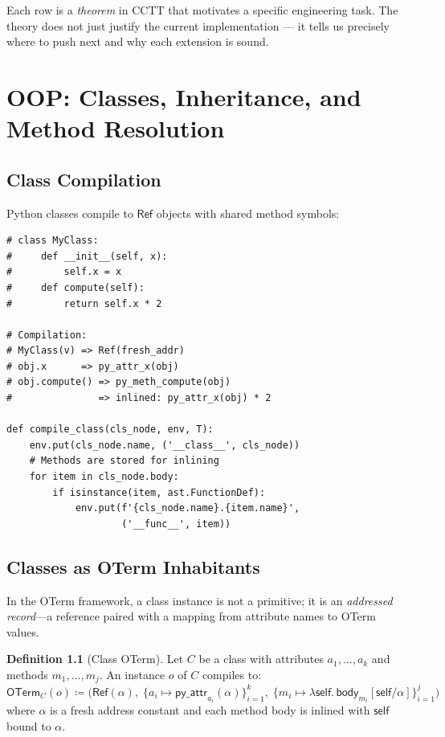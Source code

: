 \documentclass[11pt,a4paper]{report}
\theoremstyle{definition}
\newtheorem{definition}{Definition}[chapter]
\theoremstyle{plain}
\begin{document}
Each row is a \emph{theorem} in CCTT that motivates a specific
engineering task.  The theory does not just justify the current
implementation --- it tells us precisely where to push next and
why each extension is sound.


\chapter{OOP: Classes, Inheritance, and Method Resolution}
\label{ch:oop}

\section{Class Compilation}

Python classes compile to $\mathsf{Ref}$ objects with shared method
symbols:

\begin{lstlisting}[caption={Class compilation}]
# class MyClass:
#     def __init__(self, x):
#         self.x = x
#     def compute(self):
#         return self.x * 2

# Compilation:
# MyClass(v) => Ref(fresh_addr)
# obj.x      => py_attr_x(obj)
# obj.compute() => py_meth_compute(obj)
#               => inlined: py_attr_x(obj) * 2

def compile_class(cls_node, env, T):
    env.put(cls_node.name, ('__class__', cls_node))
    # Methods are stored for inlining
    for item in cls_node.body:
        if isinstance(item, ast.FunctionDef):
            env.put(f'{cls_node.name}.{item.name}',
                    ('__func__', item))
\end{lstlisting}

\section{Classes as OTerm Inhabitants}

In the OTerm framework, a class instance is not a primitive; it is
an \emph{addressed record}---a reference paired with a mapping from
attribute names to OTerm values.

\begin{definition}[Class OTerm]
Let $C$ be a class with attributes $a_1, \ldots, a_k$ and methods
$m_1, \ldots, m_j$.  An instance $o$ of $C$ compiles to:
\[
  \mathsf{OTerm}_C(o) \coloneqq \bigl(\mathsf{Ref}(\alpha),\;
    \{a_i \mapsto \mathsf{py\_attr}_{a_i}(\alpha)\}_{i=1}^k,\;
    \{m_i \mapsto \lambda \mathsf{self}.\, \mathsf{body}_{m_i}[\mathsf{self}/\alpha]\}_{i=1}^j
  \bigr)
\]
where $\alpha$ is a fresh address constant and each method body is
inlined with $\mathsf{self}$ bound to $\alpha$.
\end{definition}
\end{document}
